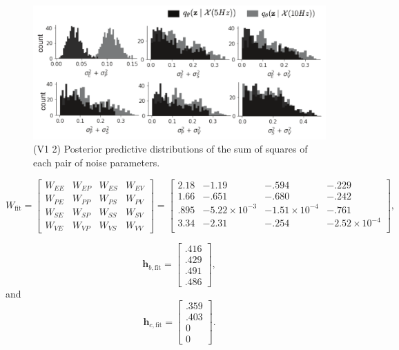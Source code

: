 \documentclass[11pt]{article}
\begin{document}
\begin{figure}
\caption{\small (V1 2)
Posterior predictive distributions of the sum of squares of each pair of noise parameters.
 }
 \label{fig:V1_2}
\begin{center}
\includegraphics[scale=.8]{figures/figV1_2/figV1_2.pdf}
\end{center}
\end{figure}

\begin{equation}
W_{\text{fit}} =  \begin{bmatrix} W_{EE} & W_{EP} & W_{ES} & W_{EV} \\
W_{PE} & W_{PP} & W_{PS} & W_{PV} \\
W_{SE} & W_{SP} & W_{SS} & W_{SV} \\
W_{VE} & W_{VP} & W_{VS} & W_{VV}  \end{bmatrix} = 
 \begin{bmatrix} 2.18 & -1.19 & -.594 & -.229 \\
 1.66 & -.651 & -.680 & -.242 \\
 .895 & -5.22 \times 10^{-3} & -1.51 \times 10^{-4}   & -.761 \\
 3.34 &  -2.31 & -.254  & -2.52 \times 10^{-4} \\
 \end{bmatrix},
\end{equation} 

\begin{equation}
\mathbf{h}_{b,\text{fit}} =
 \begin{bmatrix} .416 \\ .429 \\ .491 \\ .486 \end{bmatrix} ,
\end{equation} 
and
\begin{equation} 
\mathbf{h}_{c,\text{fit}} = 
\begin{bmatrix} .359 \\ .403 \\ 0 \\ 0 \end{bmatrix}.
\end{equation} 
\end{document}
